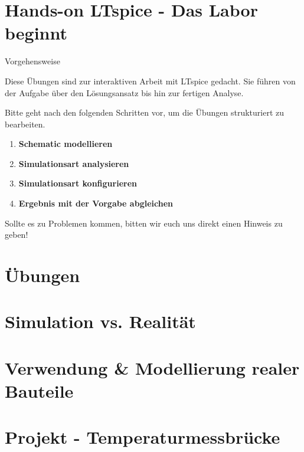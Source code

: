 \documentclass{beamer}
\begin{document}
\section{Hands-on LTspice - Das Labor beginnt}


\begin{frame}[fragile]{Vorgehensweise}

  Diese Übungen sind zur interaktiven Arbeit mit LTspice gedacht.
  Sie führen von der Aufgabe über den Lösungsansatz bis hin zur fertigen Analyse.

  Bitte geht nach den folgenden Schritten vor, um die Übungen strukturiert zu bearbeiten. 

  \begin{enumerate}
\item \textbf{Schematic modellieren}
\item \textbf{Simulationsart analysieren}
\item \textbf{Simulationsart konfigurieren}
\item \textbf{Ergebnis mit der Vorgabe abgleichen}
\end{enumerate}

Sollte es zu Problemen kommen, bitten wir euch uns direkt einen Hinweis zu geben!

  \end{frame}

  \section{Übungen}


\section{Simulation vs. Realität}


\section{Verwendung \& Modellierung realer Bauteile}




\section{Projekt - Temperaturmessbrücke}



\end{document}
